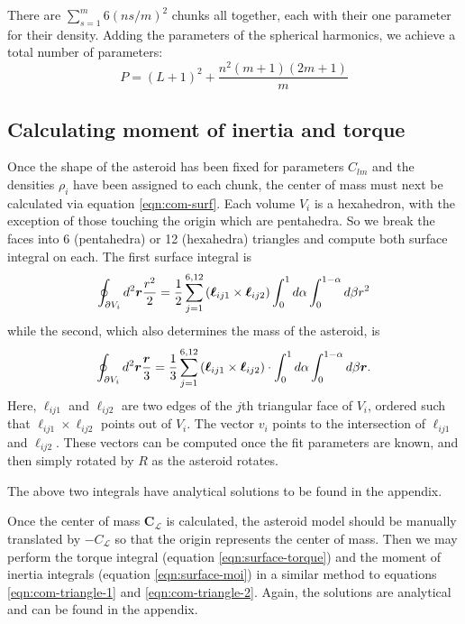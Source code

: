 \documentclass[aps,twocolumn,secnumarabic,balancelastpage,amsmath,amssymb,nofootinbib,floatfix]{revtex4-1}
\begin{document}
There are $\sum_{s=1}^m 6(ns/m)^2$ chunks all together, each with their one parameter for their density. Adding the parameters of the spherical harmonics, we achieve a total number of parameters:
\begin{equation}
    P = (L+1)^2 + \frac{n^2(m+1)(2m+1)}{m}
    \label{eqn:num-parameters}
\end{equation}


\subsection{Calculating moment of inertia and torque}
\label{sec:equations}
Once the shape of the asteroid has been fixed for parameters $C_{lm}$ and the densities $\rho_i$ have been assigned to each chunk, the center of mass must next be calculated via equation \ref{eqn:com-surf}. Each volume $V_i$ is a hexahedron, with the exception of those touching the origin which are pentahedra. So we break the faces into 6 (pentahedra) or 12 (hexahedra) triangles and compute both surface integral on each. The first surface integral is
\begin{equation}
    \oint_{\partial V_i} d^2 \bm r \frac{r^2}{2} =
    \frac{1}{2}\sum_{j=1}^{6, 12} \left( \bm \ell_{ij1}\times\bm \ell_{ij2} \right)\int_0^1 d\alpha \int_0^{1-\alpha} d\beta r^2
    \label{eqn:com-triangle-1}
\end{equation}
while the second, which also determines the mass of the asteroid, is
\begin{equation}
    \oint_{\partial V_i} d^2 \bm r \frac{\bm r}{3} =
    \frac{1}{3}\sum_{j=1}^{6, 12} \left( \bm \ell_{ij1}\times\bm \ell_{ij2} \right)\cdot \int_0^1 d\alpha \int_0^{1-\alpha} d\beta \bm r.
    \label{eqn:com-triangle-2}
\end{equation}
Here, $\bm \ell_{ij1}$ and $\bm \ell_{ij2}$ are two edges of the $j$th triangular face of $V_i$, ordered such that $\bm \ell_{ij1} \times \bm \ell_{ij2}$ points out of $V_i$. The vector $v_i$ points to the intersection of $\bm \ell_{ij1}$ and $\bm \ell_{ij2}$. These vectors can be computed once the fit parameters are known, and then simply rotated by $R$ as the asteroid rotates.

The above two integrals have analytical solutions to be found in the appendix.

Once the center of mass $\bm C_{\mathcal L}$ is calculated, the asteroid model should be manually translated by $\bm -C_{\mathcal L}$ so that the origin represents the center of mass. Then we may perform the torque integral (equation \ref{eqn:surface-torque}) and the moment of inertia integrals (equation \ref{eqn:surface-moi}) in a similar method to equations \ref{eqn:com-triangle-1} and \ref{eqn:com-triangle-2}. Again, the solutions are analytical and can be found in the appendix.
\end{document}
